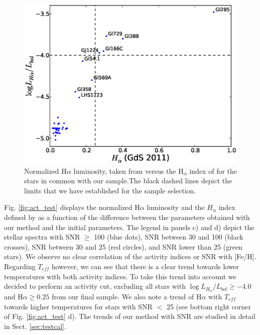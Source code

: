 \documentclass{aa}
\begin{document}
\begin{figure}[]
\centering
\includegraphics[scale=0.45]{pics/activity.eps}
\caption{Normalized H$\alpha$ luminosity, taken from \citet{Reiners-2012} versus the H$_{\alpha}$ index of \citet{Gomes_da_Silva-2011} for the stars in common with our sample.The black dashed lines depict the limits that we have established for the sample selection.}
\label{fig:activity}
\end{figure}

Fig. \ref{fig:act_test} displays the normalized H$\alpha$ luminosity and the $H_{\alpha}$ index defined by \citet{Gomes_da_Silva-2011}  as a function of the difference between the parameters obtained with our method and the initial parameters. The legend in panels c) and d) depict the stellar spectra with SNR $\geq$ 100 (blue dots), SNR between 30 and 100 (black crosses), SNR between 30 and 25 (red circles), and SNR lower than 25 (green stars). We observe no clear correlation of the activity indices or SNR with [Fe/H]. Regarding $T_{eff}$ however, we can see that there is a clear trend towards lower temperatures with both activity indices. To take this trend into account we decided to perform an activity cut, excluding all stars with $\log{L_{H_{\alpha}}/L_{bol}} \geq -4.0 $ and H$\alpha \geq 0.25$ from our final sample. We also note a trend of H$\alpha$ with $T_{eff}$ towards higher temperatures for stars with SNR $<$ 25 (see bottom right corner of Fig. \ref{fig:act_test} d). The trends of our method with SNR are studied in detail in Sect. \ref{sec:testcal}. 
\end{document}
